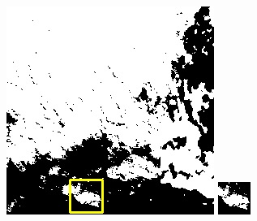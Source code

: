 \documentclass[UTF8]{ctexart}
\begin{document}
\begin{figure}[H]
{\begin{minipage}[b]{0.15\linewidth}
            \includegraphics[width=1\linewidth]{../log/spoon2/cut2/LC81620432014072LGN00_16237_my.jpg}\vspace{4pt}
            \includegraphics[width=1\linewidth]{../log/spoon2/cut2/tmp_cut_LC81620432014072LGN00_16237_my.jpg}\vspace{4pt}

\end{minipage}}
\end{figure}
\end{document}
